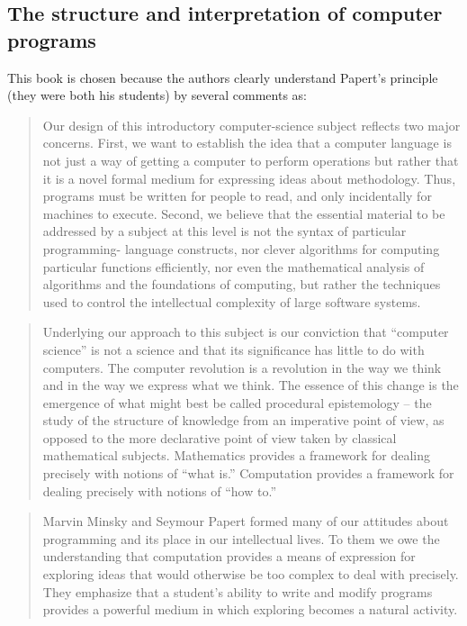 \subsection{The structure and interpretation of computer programs}

This book is chosen because the authors clearly understand Papert's principle
(they were both his students) by several comments as:


\begin{quotation}
    Our design of this introductory computer-science subject reflects two major
    concerns. First, we want to establish the idea that a computer language is not
    just a way of getting a computer to perform operations but rather that it is a
    novel formal medium for expressing ideas about methodology. Thus, programs must
    be written for people to read, and only incidentally for machines to execute.
    Second, we believe that the essential material to be addressed by a subject at
    this level is not the syntax of particular programming- language constructs, nor
    clever algorithms for computing particular functions efficiently, nor even the
    mathematical analysis of algorithms and the foundations of computing, but rather
    the techniques used to control the intellectual complexity of large software
    systems.
\cite{education:abelson_sussman__sicp}
\end{quotation}

\begin{quotation}
    Underlying our approach to this subject is our conviction that ``computer science'' is not a science and that
    its significance has little to do with computers. The computer revolution is a revolution in the way we
    think and in the way we express what we think. The essence of this change is the emergence of what might
    best be called procedural epistemology -- the study of the structure of knowledge from an imperative point
    of view, as opposed to the more declarative point of view taken by classical mathematical subjects.
    Mathematics provides a framework for dealing precisely with notions of ``what is.'' Computation provides
    a framework for dealing precisely with notions of ``how to.''
\cite{education:abelson_sussman__sicp}
\end{quotation}


\begin{quotation}
    Marvin Minsky and Seymour Papert formed many of our attitudes about programming and its place in our
    intellectual lives. To them we owe the understanding that computation provides a means of expression for
    exploring ideas that would otherwise be too complex to deal with precisely. They emphasize that a
    student's ability to write and modify programs provides a powerful medium in which exploring becomes a
    natural activity.
\cite{education:abelson_sussman__sicp}
\end{quotation}

